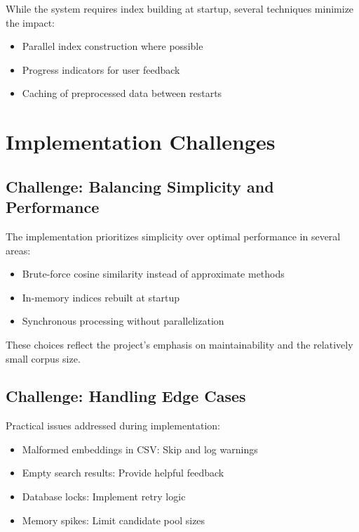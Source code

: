 While the system requires index building at startup, several techniques minimize the impact:

\begin{itemize}[leftmargin=*,itemsep=2pt,topsep=2pt]
 \item Parallel index construction where possible
 \item Progress indicators for user feedback
 \item Caching of preprocessed data between restarts
\end{itemize}

\section{Implementation Challenges}

\subsection{Challenge: Balancing Simplicity and Performance}

The implementation prioritizes simplicity over optimal performance in several areas:

\begin{itemize}[leftmargin=*,itemsep=2pt,topsep=2pt]
 \item Brute-force cosine similarity instead of approximate methods
 \item In-memory indices rebuilt at startup
 \item Synchronous processing without parallelization
\end{itemize}

These choices reflect the project's emphasis on maintainability and the relatively small corpus size.

\subsection{Challenge: Handling Edge Cases}

Practical issues addressed during implementation:

\begin{itemize}[leftmargin=*,itemsep=2pt,topsep=2pt]
 \item Malformed embeddings in CSV: Skip and log warnings
 \item Empty search results: Provide helpful feedback
 \item Database locks: Implement retry logic
 \item Memory spikes: Limit candidate pool sizes
\end{itemize}

